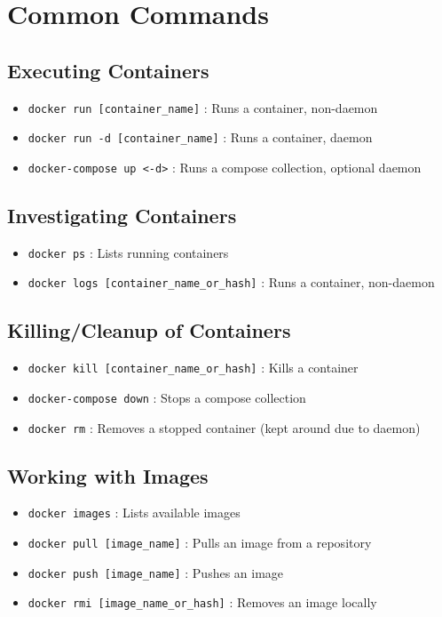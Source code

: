 \documentclass[legal,12pt,oneside,pdflatex,final,twocolumn]{article}
\begin{document}
\section{Common Commands}
\subsection{Executing Containers}
\begin{itemize}
  \item \texttt{docker run [container_name]} : Runs a container, non-daemon
  \item \texttt{docker run -d [container_name]} : Runs a container, daemon
  \item \texttt{docker-compose up <-d>} : Runs a compose collection, optional daemon
\end{itemize}
\subsection{Investigating Containers}
\begin{itemize}
  \item \texttt{docker ps} : Lists running containers
  \item \texttt{docker logs [container_name_or_hash]} : Runs a container, non-daemon
\end{itemize}
\subsection{Killing/Cleanup of Containers}
\begin{itemize}
  \item \texttt{docker kill [container_name_or_hash]} : Kills a container
  \item \texttt{docker-compose down} : Stops a compose collection
  \item \texttt{docker rm} : Removes a stopped container (kept around due to daemon)
\end{itemize}
\subsection{Working with Images}
\begin{itemize}
  \item \texttt{docker images} : Lists available images
  \item \texttt{docker pull [image_name]} : Pulls an image from a repository
  \item \texttt{docker push [image_name]} : Pushes an image
  \item \texttt{docker rmi [image_name_or_hash]} : Removes an image locally
\end{itemize}
\end{document}
